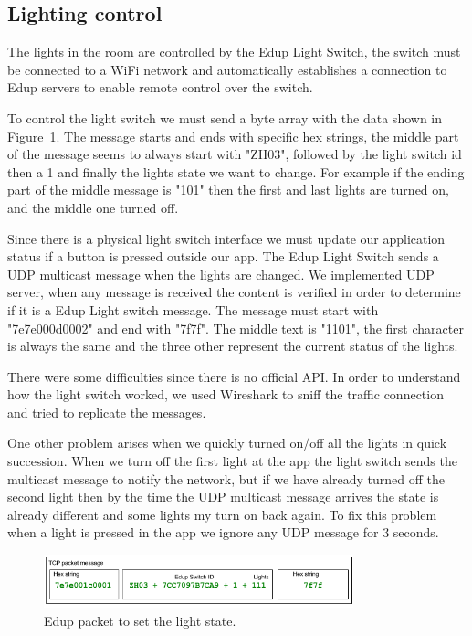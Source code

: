 \subsection{Lighting control}\label{light_imp}


The lights in the room are controlled by the Edup Light Switch, the switch must be connected to a WiFi network and automatically establishes a connection to Edup servers to enable remote control over the switch.

To control the light switch we must send a byte array with the data shown in Figure~\ref{edup_imp}.
The message starts and ends with specific hex strings, the middle part of the message seems to always start with "ZH03", followed by the light switch id then a 1 and finally the lights state we want to change. For example if the ending part of the middle message is "101" then the first and last lights are turned on, and the middle one turned off.

Since there is a physical light switch interface we must update our application status if a button is pressed outside our app.
The Edup Light Switch sends a \ac{UDP} multicast message when the lights are changed. We implemented \ac{UDP} server, when any message is received the content is verified in order to determine if it is a Edup Light switch message. The message must start with "7e7e000d0002" and end with "7f7f". The middle text is "1101", the first character is always the same and the three other represent the current status of the lights.

There were some difficulties since there is no official API. In order to understand how the light switch worked, we used Wireshark to sniff the traffic connection and tried to replicate the messages.

One other problem arises when we quickly turned on/off all the lights in quick succession. When we turn off the first light at the app the light switch sends the multicast message to notify the network, but if we have already turned off the second light then by the time the \ac{UDP} multicast message arrives the state is already different and some lights my turn on back again. To fix this problem when a light is pressed in the app we ignore any \ac{UDP} message for 3 seconds.


\begin{figure}[h]
\centering
\includegraphics[width=0.8\textwidth]{Figures/Edup_imp}
\caption{Edup packet to set the light state.}
\label{edup_imp}
\end{figure}



